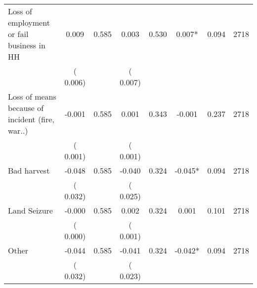\begin{tabular}{l*{7}{c}}
 Loss of employment or fail business in HH       &              0.009       &        0.585  &              0.003       &        0.530  &              0.007*       &              0.094 &  2718 \\ 
                       &       (       0.006)             &                               &       (       0.007)                     &                               &                                               &                                &                      \\ 

 Loss of means because of incident (fire, war..)       &             -0.001       &        0.585  &              0.001       &        0.343  &             -0.001       &              0.237 &  2718 \\ 
                       &       (       0.001)             &                               &       (       0.001)                     &                               &                                               &                                &                      \\ 

 Bad harvest       &             -0.048       &        0.585  &             -0.040       &        0.324  &             -0.045*       &              0.094 &  2718 \\ 
                       &       (       0.032)             &                               &       (       0.025)                     &                               &                                               &                                &                      \\ 

 Land Seizure       &             -0.000       &        0.585  &              0.002       &        0.324  &              0.001       &              0.101 &  2718 \\ 
                       &       (       0.000)             &                               &       (       0.001)                     &                               &                                               &                                &                      \\ 

 Other       &             -0.044       &        0.585  &             -0.041       &        0.324  &             -0.042*       &              0.094 &  2718 \\ 
                       &       (       0.032)             &                               &       (       0.023)                     &                               &                                               &                                &                      \\ 

\hline \end{tabular}